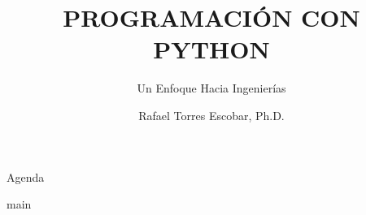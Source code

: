 \documentclass{beamer}
\title{PROGRAMACIÓN CON PYTHON}
\subtitle{Un Enfoque Hacia Ingenierías}
\institute{UNIVERSIDAD ANÁHUAC MÉXICO}
\author{Rafael Torres Escobar, Ph.D.}
\date[Anáhuac México]{}
\begin{document}
\begin{frame}
  \maketitle
\end{frame}


     \begin{frame}{Agenda}
   \tableofcontents
 \end{frame}

 

 {main}
\end{document}
